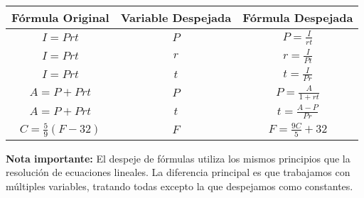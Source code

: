 \begin{center}
\begin{tabular}{|c|c|c|}
\hline
\textbf{Fórmula Original} & \textbf{Variable Despejada} & \textbf{Fórmula Despejada} \\
\hline
$I = Prt$ & $P$ & $P = \frac{I}{rt}$ \\
\hline
$I = Prt$ & $r$ & $r = \frac{I}{Pt}$ \\
\hline
$I = Prt$ & $t$ & $t = \frac{I}{Pr}$ \\
\hline
$A = P + Prt$ & $P$ & $P = \frac{A}{1 + rt}$ \\
\hline
$A = P + Prt$ & $t$ & $t = \frac{A - P}{Pr}$ \\
\hline
$C = \frac{5}{9}(F-32)$ & $F$ & $F = \frac{9C}{5} + 32$ \\
\hline
\end{tabular}
\end{center}

\textbf{Nota importante:} El despeje de fórmulas utiliza los mismos principios que la resolución de ecuaciones lineales. La diferencia principal es que trabajamos con múltiples variables, tratando todas excepto la que despejamos como constantes.